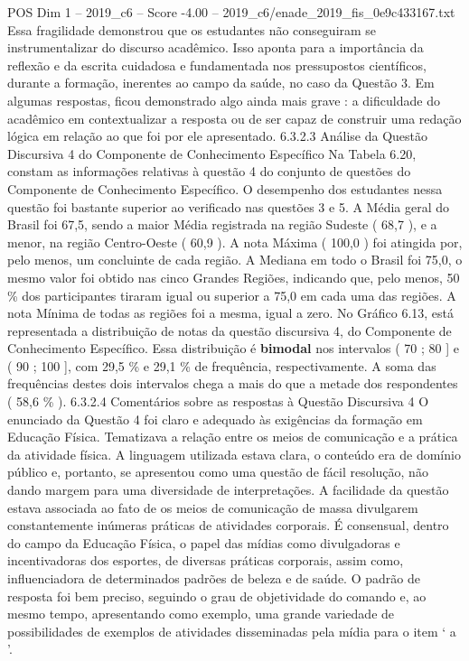 \begin{textsample}{POS Dim 1 – 2019\_c6 – Score -4.00 – 2019\_c6/enade\_2019\_fis\_0e9c433167.txt}
Essa fragilidade demonstrou que os estudantes não conseguiram se instrumentalizar do discurso acadêmico.
Isso aponta para a importância da reflexão e da escrita cuidadosa e fundamentada nos pressupostos científicos, durante a formação, inerentes ao campo da saúde, no caso da Questão 3.
Em algumas respostas, ficou demonstrado algo ainda mais grave : a dificuldade do acadêmico em contextualizar a resposta ou de ser capaz de construir uma redação lógica em relação ao que foi por ele apresentado. 6.3.2.3 Análise da Questão Discursiva 4 do Componente de Conhecimento Específico Na Tabela 6.20, constam as informações relativas à questão 4 do conjunto de questões do Componente de Conhecimento Específico.
O desempenho dos estudantes nessa questão foi bastante superior ao verificado nas questões 3 e 5.
A Média geral do Brasil foi 67,5, sendo a maior Média registrada na região Sudeste ( 68,7 ), e a menor, na região Centro-Oeste ( 60,9 ).
A nota Máxima ( 100,0 ) foi atingida por, pelo menos, um concluinte de cada região.
A Mediana em todo o Brasil foi 75,0, o mesmo valor foi obtido nas cinco Grandes Regiões, indicando que, pelo menos, 50 \% dos participantes tiraram igual ou superior a 75,0 em cada uma das regiões.
A nota Mínima de todas as regiões foi a mesma, igual a zero.
No Gráfico 6.13, está representada a distribuição de notas da questão discursiva 4, do Componente de Conhecimento Específico.
Essa distribuição é \textbf{bimodal} nos intervalos ( 70 ; 80 ] e ( 90 ; 100 ], com 29,5 \% e 29,1 \% de frequência, respectivamente.
A soma das frequências destes dois intervalos chega a mais do que a metade dos respondentes ( 58,6 \% ). 6.3.2.4 Comentários sobre as respostas à Questão Discursiva 4 O enunciado da Questão 4 foi claro e adequado às exigências da formação em Educação Física.
Tematizava a relação entre os meios de comunicação e a prática da atividade física.
A linguagem utilizada estava clara, o conteúdo era de domínio público e, portanto, se apresentou como uma questão de fácil resolução, não dando margem para uma diversidade de interpretações.
A facilidade da questão estava associada ao fato de os meios de comunicação de massa divulgarem constantemente inúmeras práticas de atividades corporais.
É consensual, dentro do campo da Educação Física, o papel das mídias como divulgadoras e incentivadoras dos esportes, de diversas práticas corporais, assim como, influenciadora de determinados padrões de beleza e de saúde.
O padrão de resposta foi bem preciso, seguindo o grau de objetividade do comando e, ao mesmo tempo, apresentando como exemplo, uma grande variedade de possibilidades de exemplos de atividades disseminadas pela mídia para o item ‘ a ’.

\end{textsample}
